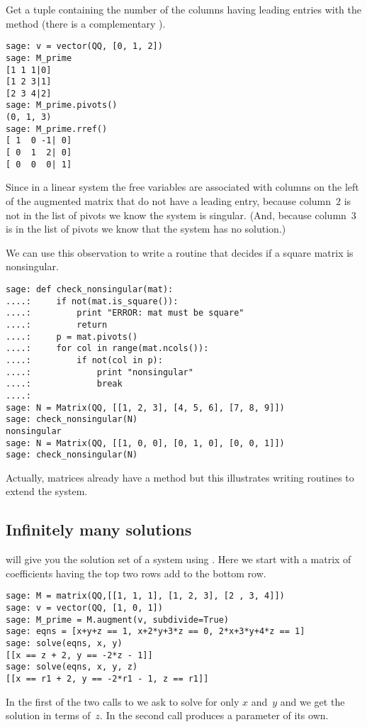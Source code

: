 Get a tuple containing the number of the columns having leading entries with 
the  method
(there is a complementary ).
\begin{lstlisting}[style=python]
sage: v = vector(QQ, [0, 1, 2])
sage: M_prime                  
[1 1 1|0]
[1 2 3|1]
[2 3 4|2]
sage: M_prime.pivots()         
(0, 1, 3)
sage: M_prime.rref()
[ 1  0 -1| 0]
[ 0  1  2| 0]
[ 0  0  0| 1]  
\end{lstlisting}
Since in a linear system the 
free variables are associated with columns on the left of the augmented 
matrix that do not have 
a leading entry, because column~$2$ is not in the list of pivots we know the
system is singular.
(And, because column~$3$ is in the list of pivots we know that 
the system has no solution.)

We can use this observation to write a routine that decides if a 
square matrix is nonsingular.
\begin{lstlisting}[style=python]
sage: def check_nonsingular(mat):
....:     if not(mat.is_square()):
....:         print "ERROR: mat must be square"
....:         return
....:     p = mat.pivots()
....:     for col in range(mat.ncols()):
....:         if not(col in p):
....:             print "nonsingular"
....:             break
....:          
sage: N = Matrix(QQ, [[1, 2, 3], [4, 5, 6], [7, 8, 9]])
sage: check_nonsingular(N)                                
nonsingular
sage: N = Matrix(QQ, [[1, 0, 0], [0, 1, 0], [0, 0, 1]])
sage: check_nonsingular(N)                                   
\end{lstlisting}
Actually, \Sage{} matrices already have a method 
but this illustrates writing routines to extend the system.



\subsection{Infinitely many solutions}
\Sage{} will give you the solution set of a system using .
Here we start with a matrix of coefficients having the top two rows add to
the bottom row.
\begin{lstlisting}[style=python]
sage: M = matrix(QQ,[[1, 1, 1], [1, 2, 3], [2 , 3, 4]])    
sage: v = vector(QQ, [1, 0, 1])                            
sage: M_prime = M.augment(v, subdivide=True)               
sage: eqns = [x+y+z == 1, x+2*y+3*z == 0, 2*x+3*y+4*z == 1]
sage: solve(eqns, x, y)   
[[x == z + 2, y == -2*z - 1]]  
sage: solve(eqns, x, y, z)                                 
[[x == r1 + 2, y == -2*r1 - 1, z == r1]]
\end{lstlisting}
In the first of the two calls to  we ask \Sage{} 
to solve for only $x$ and~$y$ and we get the solution in terms of~$z$.
In the second call \Sage{} produces a parameter of its own.   




